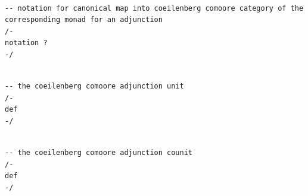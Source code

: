 \documentclass{book}
\newcounter{lcounter}
\begin{document}
\begin{center}
\begin{tcolorbox}[width=5in,colback={white},title={\begin{center}\texttt{Lean \thelcounter} \addtocounter{lcounter}{1}  \end{center}},colbacktitle=Blue,coltitle=black]
\begin{verbatim}

-- notation for canonical map into coeilenberg comoore category of the corresponding monad for an adjunction
/-
notation ?
-/

\end{verbatim}%
\end{tcolorbox}
\end{center}



\begin{center}
\begin{tcolorbox}[width=5in,colback={white},title={\begin{center}\texttt{Lean \thelcounter} \addtocounter{lcounter}{1}  \end{center}},colbacktitle=Blue,coltitle=black]
\begin{verbatim}

-- the coeilenberg comoore adjunction unit
/-
def
-/

\end{verbatim}%
\end{tcolorbox}
\end{center}


\begin{center}
\begin{tcolorbox}[width=5in,colback={white},title={\begin{center}\texttt{Lean \thelcounter} \addtocounter{lcounter}{1}  \end{center}},colbacktitle=Blue,coltitle=black]
\begin{verbatim}

-- the coeilenberg comoore adjunction counit
/-
def
-/

\end{verbatim}%
\end{tcolorbox}
\end{center}
\end{document}
